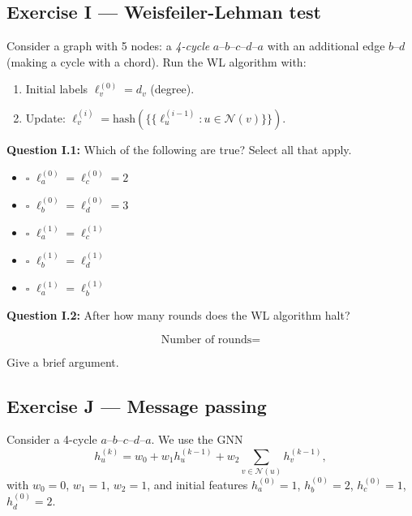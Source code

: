 \documentclass[12pt,a4paper]{article}
\begin{document}
\vspace{3cm}

\newpage
\subsection*{Exercise I --- Weisfeiler-Lehman test}

Consider a graph with 5 nodes: a \emph{4-cycle} $a$--$b$--$c$--$d$--$a$ with an additional
edge $b$--$d$ (making a cycle with a chord).  Run the WL algorithm with:
\begin{enumerate}[noitemsep]
  \item Initial labels $\ell^{(0)}_v = d_v$ (degree).
  \item Update: $\ell^{(i)}_v=\mathrm{hash}(\{\!\{\ell^{(i-1)}_u:u\in\mathcal{N}(v)\}\!\})$.
\end{enumerate}

\textbf{Question I.1:} Which of the following are true?  Select all that apply.

\begin{itemize}[noitemsep,label={}]
  \item[\textbf{A}] $\square$ \quad $\ell^{(0)}_a = \ell^{(0)}_c = 2$
  \item[\textbf{B}] $\square$ \quad $\ell^{(0)}_b = \ell^{(0)}_d = 3$
  \item[\textbf{C}] $\square$ \quad $\ell^{(1)}_a = \ell^{(1)}_c$
  \item[\textbf{D}] $\square$ \quad $\ell^{(1)}_b = \ell^{(1)}_d$
  \item[\textbf{E}] $\square$ \quad $\ell^{(1)}_a = \ell^{(1)}_b$
\end{itemize}

\textbf{Question I.2:} After how many rounds does the WL algorithm halt?

\[
  \text{Number of rounds} =
\]

Give a brief argument.

\vspace{3cm}

\subsection*{Exercise J --- Message passing}

Consider a 4-cycle $a$--$b$--$c$--$d$--$a$.  We use the GNN
\[
  h_u^{(k)} = w_0 + w_1 h_u^{(k-1)} + w_2\!\sum_{v\in\mathcal{N}(u)} h_v^{(k-1)}, \tag{11}
\]
with $w_0=0$, $w_1=1$, $w_2=1$, and initial features $h_a^{(0)}=1$, $h_b^{(0)}=2$,
$h_c^{(0)}=1$, $h_d^{(0)}=2$.
\end{document}
